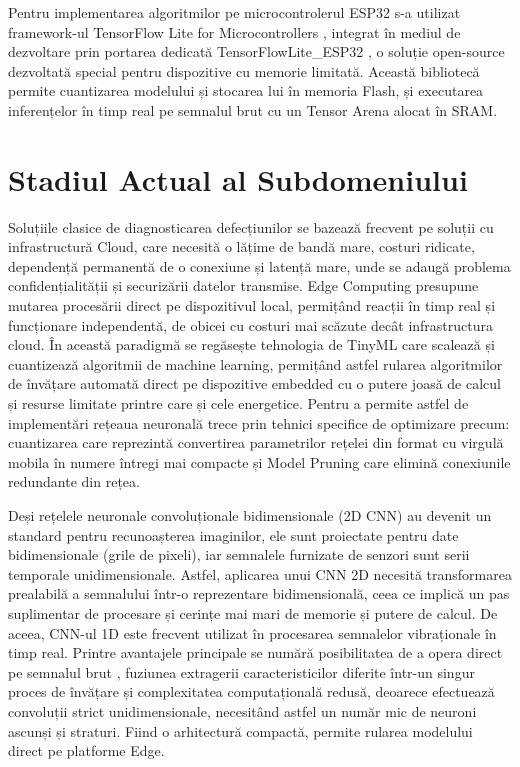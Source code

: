 	
	Pentru implementarea algoritmilor pe microcontrolerul ESP32 s-a utilizat framework-ul TensorFlow Lite for Microcontrollers \cite{tensorflow:tflitemicro_github}, integrat în mediul de dezvoltare prin portarea dedicată TensorFlowLite\_ESP32 \cite{tanaka2026tflite_esp32}, o soluție open-source dezvoltată special pentru dispozitive cu memorie limitată. Această bibliotecă permite cuantizarea modelului și stocarea lui în memoria Flash, și executarea inferențelor în timp real pe semnalul brut cu un Tensor Arena alocat în SRAM. \cite{esp32_datasheet, tensorflow:tflitemicro_github} 
	
\section{Stadiul Actual al Subdomeniului}
	
	Soluțiile clasice de diagnosticarea defecțiunilor se bazează frecvent pe soluții cu infrastructură Cloud, care necesită o lățime de bandă mare, costuri ridicate, dependență permanentă de o conexiune și latență mare, unde se adaugă problema confidențialității și securizării datelor transmise. \cite{bala2024artificial, alfarag3embedded, gupta2025embedded} Edge Computing presupune mutarea procesării direct pe dispozitivul local, permițând reacții în timp real și funcționare independentă, de obicei cu costuri mai scăzute decât infrastructura cloud. În această paradigmă se regăsește tehnologia de TinyML care scalează și cuantizează algoritmii de machine learning, permițând astfel rularea algoritmilor de învățare automată direct pe dispozitive embedded cu o putere joasă de calcul și resurse limitate printre care și cele energetice. Pentru a permite astfel de implementări rețeaua neuronală trece prin tehnici specifice de optimizare precum: cuantizarea care reprezintă convertirea parametrilor rețelei din format cu virgulă mobila în numere întregi mai compacte și Model Pruning care elimină conexiunile redundante din rețea. \cite{gupta2025embedded, bala2024artificial}
	
	Deși rețelele neuronale convoluționale bidimensionale (2D CNN) au devenit un standard pentru recunoașterea imaginilor, ele sunt proiectate pentru date bidimensionale (grile de pixeli), iar semnalele furnizate de senzori sunt serii temporale unidimensionale. Astfel, aplicarea unui CNN 2D necesită transformarea prealabilă a semnalului într-o reprezentare bidimensională, ceea ce implică un pas suplimentar de procesare și cerințe mai mari de memorie și putere de calcul. \cite{kiranyaz20191, bitam2025artificial} De aceea, CNN-ul 1D este frecvent utilizat în procesarea semnalelor vibraționale în timp real. \cite{kiranyaz20191, bala2024artificial} Printre avantajele principale se numără posibilitatea de a opera direct pe semnalul brut \cite{kiranyaz20191, ince2016real}, fuziunea extragerii caracteristicilor diferite într-un singur proces de învățare \cite{kiranyaz20191, ince2016real} și complexitatea computațională redusă, deoarece efectuează convoluții strict unidimensionale, necesitând astfel un număr mic de neuroni ascunși și straturi. \cite{kiranyaz20191} Fiind o arhitectură compactă, permite rularea modelului direct pe platforme Edge. \cite{bala2024artificial, gupta2025embedded}
	
